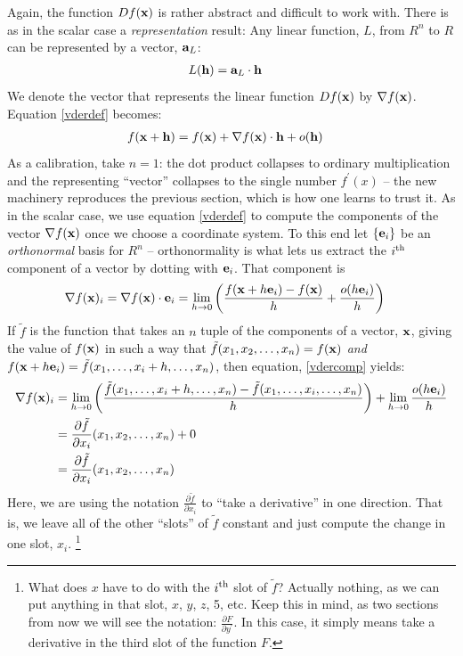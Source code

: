 \documentclass{article}
\begin{document}
Again, the function $Df({\bf x})$ is rather abstract and difficult to work with.
There is as in the scalar case a {\em representation\/} result:
Any linear function, $L$, from $R^n$ to $R$ can be represented by a vector, ${\bf a}_L$:
\begin{align}
  L({\bf h}) &= {\bf a}_L \cdot {\bf h}
\end{align}
We denote the vector that represents the linear function $Df({\bf x})$ by
$\nabla f({\bf x})$. Equation \eqref{vderdef} becomes:
\begin{align}
  f({\bf x} + {\bf h}) &= f({\bf x}) + \nabla f({\bf x}) \cdot {\bf h} + o({\bf h})
\end{align}
As a calibration, take $n = 1$: the dot product collapses to ordinary
multiplication and the representing ``vector''{} collapses to the single
number $f^\prime(x)$ -- the new machinery reproduces the previous section,
which is how one learns to trust it.
As in the scalar case, we use equation \eqref{vderdef}
to compute the components of the vector $\nabla f({\bf x})$ once we choose
a coordinate system. To this end let $\{{\bf e}_i\}$ be an {\em orthonormal\/}
basis for $R^n$ -- orthonormality is what lets us extract the $i^{\rm th}$
component of a vector by dotting with ${\bf e}_i$. That component is
\begin{align}
  \nabla f({\bf x})_i &=  \nabla f({\bf x})\cdot {\bf e}_i =
  \lim_{h \rightarrow 0} \left( \frac{f({\bf x} + h {\bf e}_i) - f({\bf x})}{h} + \frac{o(h {\bf e}_i)}{h}\right) \label{vdercomp}
\end{align}
If ${\tilde f}$
is the function that takes an $n$ tuple of the components of a vector, ${\bf x}$,
giving the value of $f({\bf x})$ in such a way that
${\tilde f}(x_1, x_2, \ldots, x_n) = f({\bf x})$ {\em and\/}
$f({\bf x} + h {\bf e}_i) = {\tilde f}(x_1, \ldots, x_i + h, \ldots, x_n)$,
then equation, \eqref{vdercomp} yields:
\begin{align}
  \nabla f({\bf x})_i &=
    \lim_{h \rightarrow 0} \left(\frac{{\tilde f}(x_1, \ldots, x_i + h, \ldots, x_n) - {\tilde f}(x_1, \ldots, x_i, \ldots, x_n)}{h}\right)
    + \lim_{h \rightarrow 0} \frac{o(h {\bf e}_i)}{h}
    \nonumber \\
&= \frac{\partial {\tilde f}}{\partial x_i}(x_1, x_2, \ldots, x_n) + 0 \nonumber \\
&= \frac{\partial {\tilde f}}{\partial x_i}(x_1, x_2, \ldots, x_n)
\end{align}
 Here, we are using the notation $\frac{\partial {\tilde f}}{\partial x_i}$ to
``take a derivative''{} in one direction. That is, we leave all of the other ``slots''{}
of ${\tilde f}$ constant and just compute the change in one slot, $x_i$.%
\footnote{What does $x$ have to do with the $i^{\rm th}$ slot of ${\tilde f}$? Actually
nothing, as we can put anything in that slot, $x$, $y$, $z$, 5, etc. Keep this in mind,
as two sections from now we will see the notation: $\frac{\partial F}{\partial y^\prime}$.
In this case, it simply means take a derivative in the third slot of the function $F$.}
\end{document}
